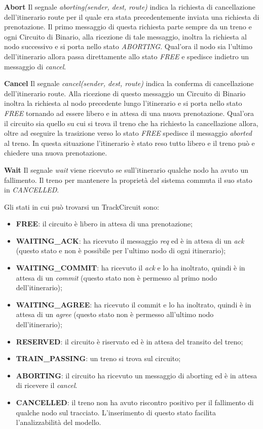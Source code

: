 \textbf{Abort} Il segnale \textit{aborting(sender, dest, route)} indica la
richiesta di cancellazione dell’itinerario route per il quale era stata precedentemente inviata una
richiesta di prenotazione. Il primo messaggio di questa richiesta parte sempre
da un treno e ogni Circuito di Binario, alla ricezione di tale messaggio, inoltra
la richiesta al nodo successivo e si porta nello stato \textit{ABORTING}.
Qual’ora il nodo sia l’ultimo dell’itinerario allora passa direttamente allo
stato \textit{FREE} e spedisce indietro un messaggio di \textit{cancel}.

\textbf{Cancel} Il segnale \textit{cancel(sender, dest, route)} indica la
conferma di cancellazione dell’itinerario route. Alla ricezione di questo messaggio un Circuito di Binario
inoltra la richiesta al nodo precedente lungo l’itinerario e si porta nello stato
\textit{FREE} tornando ad essere libero e in attesa di una nuova prenotazione.
Qual’ora il circuito sia quello su cui si trova il treno che ha richiesto la cancellazione allora,
oltre ad eseguire la trasizione verso lo stato \textit{FREE} spedisce il
messaggio \textit{aborted} al treno. In questa situazione l’itinerario è stato
reso tutto libero e il treno può e chiedere una nuova prenotazione.

\textbf{Wait} Il segnale \textit{wait} viene ricevuto se sull'itinerario qualche
nodo ha avuto un fallimento. Il treno per mantenere la proprietà del
sistema commuta il suo stato in \textit{CANCELLED}.

Gli stati in cui può trovarsi un TrackCircuit sono:
\begin{itemize}
  \item \textbf{FREE}: il circuito è libero in attesa di una prenotazione;
  \item \textbf{WAITING\_ACK}: ha ricevuto il messaggio \textit{req} ed è in
  attesa di un \textit{ack} (questo stato e non è possibile per l’ultimo nodo di ogni
  itinerario);
  \item \textbf{WAITING\_COMMIT}: ha ricevuto il \textit{ack} e lo ha inoltrato,
  quindi è in attesa di un \textit{commit} (questo stato non è permesso al primo
  nodo dell’itinerario);
  \item \textbf{WAITING\_AGREE}: ha ricevuto il commit e lo ha inoltrato, quindi
  è in attesa di un \textit{agree} (questo stato non è permesso all’ultimo nodo
  dell’itinerario);
  \item \textbf{RESERVED}: il circuito è riservato ed è in attesa del transito
  del treno;
  \item \textbf{TRAIN\_PASSING}: un treno si trova sul circuito;
  \item \textbf{ABORTING}: il circuito ha ricevuto un messaggio di aborting ed è
  in attesa di ricevere il \textit{cancel}.
  \item \textbf{CANCELLED}: il treno non ha avuto riscontro positivo per il
  fallimento di qualche nodo sul tracciato. L'inserimento di questo stato
  facilita l'analizzabilità del modello. 
\end{itemize}

